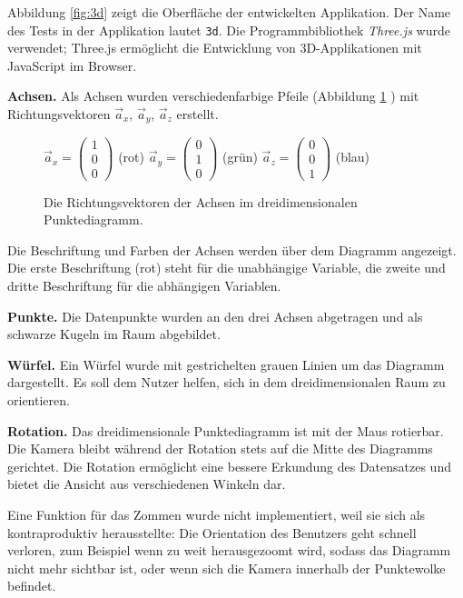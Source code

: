 Abbildung \ref{fig:3d} zeigt die Oberfläche der entwickelten Applikation. Der Name des Tests in der Applikation lautet \texttt{3d}. Die Programmbibliothek \textit{Three.js} \cite{threejs} wurde verwendet; Three.js ermöglicht die Entwicklung von 3D-Applikationen mit JavaScript im Browser.

\textbf{Achsen.} Als Achsen wurden verschiedenfarbige Pfeile (Abbildung \ref{fig:vectors} ) mit Richtungsvektoren $\vec{a}_x$, $\vec{a}_y$, $\vec{a}_z$ erstellt.

\begin{figure}[H]
	\centering
	$\vec{a}_x=\begin{pmatrix} 1 \\ 0 \\ 0 \end{pmatrix}$ (rot)\qquad
	$\vec{a}_y=\begin{pmatrix} 0 \\ 1 \\ 0 \end{pmatrix}$ (grün)\qquad
	$\vec{a}_z=\begin{pmatrix} 0 \\ 0 \\ 1 \end{pmatrix}$ (blau)\qquad
	\caption{Die Richtungsvektoren der Achsen im dreidimensionalen Punktediagramm.}
	\label{fig:vectors}
\end{figure}

Die Beschriftung und Farben der Achsen werden über dem Diagramm angezeigt. Die erste Beschriftung (rot) steht für die unabhängige Variable, die zweite und dritte Beschriftung für die abhängigen Variablen.

\textbf{Punkte.} Die Datenpunkte wurden an den drei Achsen abgetragen und als schwarze Kugeln im Raum abgebildet.

\textbf{Würfel.} Ein Würfel wurde mit gestrichelten grauen Linien um das Diagramm dargestellt. Es soll dem Nutzer helfen, sich in dem dreidimensionalen Raum zu orientieren.

\textbf{Rotation.} Das dreidimensionale Punktediagramm ist mit der Maus rotierbar. Die Kamera bleibt während der Rotation stets auf die Mitte des Diagramms gerichtet. Die Rotation ermöglicht eine bessere Erkundung des Datensatzes und bietet die Ansicht aus verschiedenen Winkeln dar.

Eine Funktion für das Zommen wurde nicht implementiert, weil sie sich als kontraproduktiv herausstellte: Die Orientation des Benutzers geht schnell verloren, zum Beispiel wenn zu weit herausgezoomt wird, sodass das Diagramm nicht mehr sichtbar ist, oder wenn sich die Kamera innerhalb der Punktewolke befindet.

